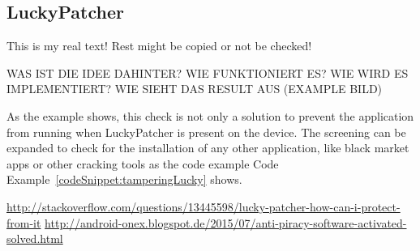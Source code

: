\subsection{LuckyPatcher} \label{subsection:counter-tampering-luckypatcher}
This is my real text! Rest might be copied or not be checked!



WAS IST DIE IDEE DAHINTER? WIE FUNKTIONIERT ES? WIE WIRD ES IMPLEMENTIERT? WIE SIEHT DAS RESULT AUS (EXAMPLE BILD)\newline

As the example shows, this check is not only a solution to prevent the application from running when LuckyPatcher is present on the device. The screening can be expanded to check for the installation of any other application, like black market apps or other cracking tools as the code example Code Example~\ref{codeSnippet:tamperingLucky} shows.

\url{http://stackoverflow.com/questions/13445598/lucky-patcher-how-can-i-protect-from-it}\newline
\url{http://android-onex.blogspot.de/2015/07/anti-piracy-software-activated-solved.html}\newline



